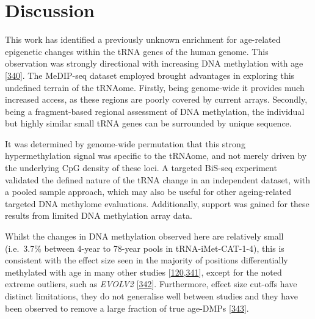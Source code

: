 \documentclass[
]{book}
\begin{document}
\newpage

\hypertarget{tRNA-Discussion}{%
\section{Discussion}\label{tRNA-Discussion}}

This work has identified a previously unknown enrichment for age-related epigenetic changes within the tRNA genes of the human genome.
This observation was strongly directional with increasing DNA methylation with age {[}\protect\hyperlink{ref-Ehrlich2019}{340}{]}.
The MeDIP-seq dataset employed brought advantages in exploring this undefined terrain of the tRNAome.
Firstly, being genome-wide it provides much increased access, as these regions are poorly covered by current arrays.
Secondly, being a fragment-based regional assessment of DNA methylation, the individual but highly similar small tRNA genes can be surrounded by unique sequence.

It was determined by genome-wide permutation that this strong hypermethylation signal was specific to the tRNAome, and not merely driven by the underlying CpG density of these loci.
A targeted BiS-seq experiment validated the defined nature of the tRNA change in an independent dataset, with a pooled sample approach, which may also be useful for other ageing-related targeted DNA methylome evaluations.
Additionally, support was gained for these results from limited DNA methylation array data.

Whilst the changes in DNA methylation observed here are relatively small (i.e.~3.7\% between 4-year to 78-year pools in tRNA-iMet-CAT-1-4), this is consistent with the effect size seen in the majority of positions differentially methylated with age in many other studies {[}\protect\hyperlink{ref-Slieker2016}{120},\protect\hyperlink{ref-Xu2014b}{341}{]}, except for the noted extreme outliers, such as \emph{EVOLV2} {[}\protect\hyperlink{ref-Slieker2018}{342}{]}.
Furthermore, effect size cut-offs have distinct limitations, they do not generalise well between studies and they have been observed to remove a large fraction of true age-DMPs {[}\protect\hyperlink{ref-Zhu2018}{343}{]}.
\end{document}
